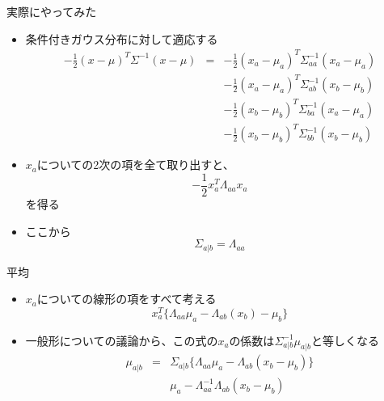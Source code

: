                   \begin{frame}{実際にやってみた}
                   \begin{itemize}
                    \item 条件付きガウス分布に対して適応する
                          \begin{eqnarray*}
                           -\frac{1}{2}(x - \mu)^{T}\Sigma^{-1}(x-\mu) &= &
                            -\frac{1}{2}(x_a - \mu_a)^{T}\Sigma_{aa}^{-1}(x_a-\mu_a) \\
                           &&-\frac{1}{2}(x_a - \mu_a)^{T}\Sigma_{ab}^{-1}(x_b-\mu_b) \\
                           &&-\frac{1}{2}(x_b - \mu_b)^{T}\Sigma_{ba}^{-1}(x_a-\mu_a) \\
                           &&-\frac{1}{2}(x_b - \mu_b)^{T}\Sigma_{bb}^{-1}(x_b-\mu_b)
                          \end{eqnarray*}
                    \item $x_a$についての2次の項を全て取り出すと、
                          \begin{equation}
                           -\frac{1}{2}x_a^T\Lambda_{aa}x_a
                          \end{equation}
                          を得る
                    \item ここから
                          \begin{equation}
                           \Sigma_{a|b} = \Lambda_{aa}
                          \end{equation}
                   \end{itemize}
                  \end{frame}

                    \begin{frame}{平均}
                     \begin{itemize}
                      \item $x_a$についての線形の項をすべて考える
                            \begin{equation}
                             x_a^T\{ \Lambda_{aa}\mu_a-\Lambda_{ab}(x_b)-\mu_b\}
                            \end{equation}
                      \item 一般形についての議論から、この式の$x_a$の係数は$\Sigma^{-1}_{a|b}\mu_{a|b}$と等しくなる
                            \begin{eqnarray}
                             \mu_{a|b} &=& \Sigma_{a|b}\{\Lambda_{aa}\mu_a-\Lambda_{ab}(x_b-\mu_b)\}\\
                             & & \mu_a - \Lambda_{aa}^{-1}\Lambda_{ab}(x_b-\mu_b)
                            \end{eqnarray}
                     \end{itemize}
                    \end{frame}


